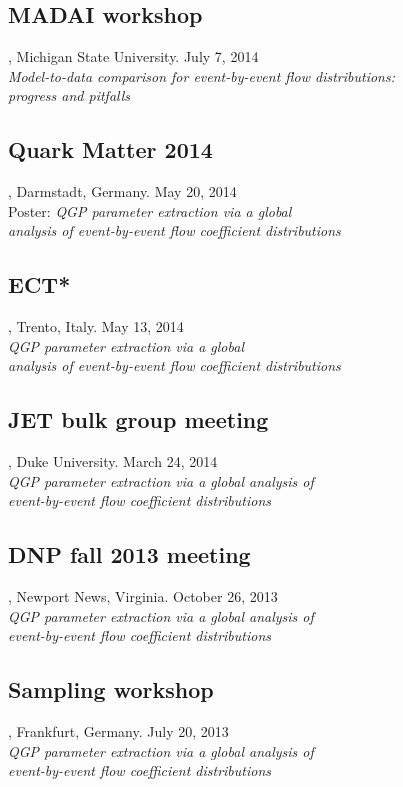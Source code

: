 \documentclass[letterpaper,10pt]{article}
\begin{document}
\subsection{MADAI workshop}, Michigan State University. \hfill July 7, 2014 \\
\emph{Model-to-data comparison for event-by-event flow distributions: \\ progress and pitfalls}

\subsection{Quark Matter 2014}, Darmstadt, Germany. \hfill May 20, 2014 \\
Poster: \emph{QGP parameter extraction via a global \\ analysis of event-by-event flow coefficient distributions}

\subsection{ECT*}, Trento, Italy. \hfill May 13, 2014 \\
\emph{QGP parameter extraction via a global \\ analysis of event-by-event flow coefficient distributions}

\subsection{JET bulk group meeting}, Duke University. \hfill March 24, 2014 \\
\emph{QGP parameter extraction via a global analysis of \\ event-by-event flow coefficient distributions}

\subsection{DNP fall 2013 meeting}, Newport News, Virginia. \hfill October 26, 2013 \\
\emph{QGP parameter extraction via a global analysis of \\ event-by-event flow coefficient distributions}

\subsection{Sampling workshop}, Frankfurt, Germany. \hfill July 20, 2013 \\
\emph{QGP parameter extraction via a global analysis of \\ event-by-event flow coefficient distributions}
\end{document}
